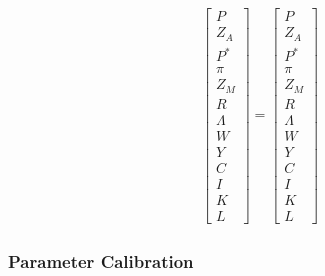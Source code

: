 \documentclass[
	12pt,
	]{article}
\numberwithin{equation}{section}
\theoremstyle{definition}
\theoremstyle{plain}
\theoremstyle{plain}
\theoremstyle{plain}
\begin{document}
\vspace*{-1cm}

\begin{align}
	\begin{bmatrix}
		P \\
		Z_A \\
		P^\ast \\
		\pi \\
		Z_M \\
		R \\
		\Lambda \\
		W \\
		Y \\
		C \\
		I \\
		K \\
		L
	\end{bmatrix} = 
	\begin{bmatrix}
		P \\
		Z_A \\
		P^\ast \\
		\pi \\
		Z_M \\
		R \\
		\Lambda \\
		W \\
		Y \\
		C \\
		I \\
		K \\
		L
	\end{bmatrix}
\end{align}

\newpage


\subsubsection{Parameter Calibration}

\vspace*{0.5cm}
\end{document}
